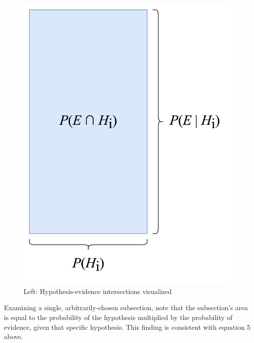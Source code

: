\documentclass[12pt]{article}
\begin{document}
\begin{figure}[h!]
\begin{minipage}{0.28\textwidth}
        \includegraphics[width=\textwidth]{assets/visual_6.png}
    \end{minipage}
    \caption{Left: Hypothesis-evidence intersections visualized}
    \label{fig:both_visuals}
\end{figure}

\noindent Examining a single, arbitrarily-chosen subsection, note that the subsection's area is equal to the probability of the hypothesis multiplied by the probability of evidence, given that specific hypothesis. This finding is consistent with equation 5 above.
\end{document}
